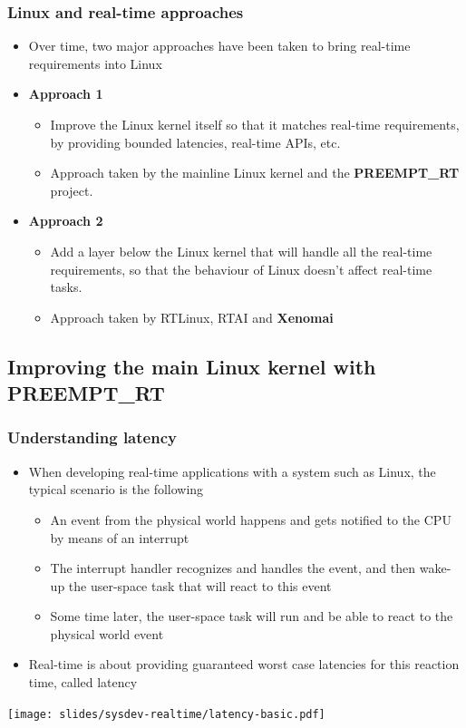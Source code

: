 \begin{frame}
  \frametitle{Linux and real-time approaches}
  \begin{itemize}
  \item Over time, two major approaches have been taken to bring
    real-time requirements into Linux
  \item {\bf Approach 1}
    \begin{itemize}
    \item Improve the Linux kernel itself so that it matches real-time
      requirements, by providing bounded latencies, real-time APIs,
      etc.
    \item Approach taken by the mainline Linux kernel and the
      {\bf PREEMPT\_RT} project.
    \end{itemize}
  \item {\bf Approach 2}
    \begin{itemize}
    \item Add a layer below the Linux kernel that will handle all the
      real-time requirements, so that the behaviour of Linux doesn't
      affect real-time tasks.
    \item Approach taken by RTLinux, RTAI and {\bf Xenomai}
    \end{itemize}
  \end{itemize}
\end{frame}

\subsection[PREEMPT\_RT Patches]{Improving the main Linux kernel with
  PREEMPT\_RT}

\begin{frame}
  \frametitle{Understanding latency}
  \begin{itemize}
  \item When developing real-time applications with a system such as
    Linux, the typical scenario is the following
    \begin{itemize}
    \item An event from the physical world happens and gets notified
      to the CPU by means of an interrupt
    \item The interrupt handler recognizes and handles the event, and
      then wake-up the user-space task that will react to this event
    \item Some time later, the user-space task will run and be able to
      react to the physical world event
    \end{itemize}
  \item Real-time is about providing guaranteed worst case latencies
    for this reaction time, called latency
  \end{itemize}
  \begin{center}
    \texttt{[image: slides/sysdev-realtime/latency-basic.pdf]}
  \end{center}
\end{frame}

